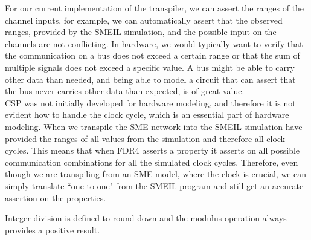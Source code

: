 For our current implementation of the transpiler, we can assert the ranges of the channel inputs, for example, we can automatically assert that the observed ranges, provided by the SMEIL simulation, and the possible input on the \cspm{} channels are not conflicting.
In hardware, we would typically want to verify that the communication on a bus does not exceed a certain range or that the sum of multiple signals does not exceed a specific value. A bus might be able to carry other data than needed, and being able to model a circuit that can assert that the bus never carries other data than expected, is of great value.
\\

CSP was not initially developed for hardware modeling, and therefore it is not evident how to handle the clock cycle, which is an essential part of hardware modeling. When we transpile the SME network into \cspm{} the SMEIL simulation have provided the ranges of all values from the simulation and therefore all clock cycles. This means that when FDR4 asserts a property it asserts on all possible communication combinations for all the simulated clock cycles. Therefore, even though we are transpiling from an SME model, where the clock is crucial, we can simply translate ``one-to-one" from the SMEIL program and still get an accurate assertion on the properties.

Integer division is defined to round down and the modulus operation always provides a positive result.